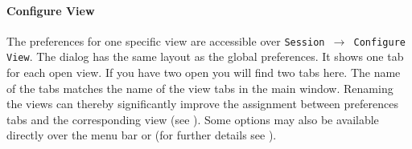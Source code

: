 \paragraph{Configure View}
The preferences for one specific view are accessible over \texttt{Session $\rightarrow$ Configure View}. The dialog  has the same layout as the global preferences. It shows one tab for each open view. If you have two open \stviews you will find two tabs here. The name of the tabs matches the name of the view tabs in the main window. Renaming the views can thereby significantly improve the assignment between preferences tabs and the corresponding view (see ). Some options may also be available directly over the menu bar or \tbar (for further details see ).